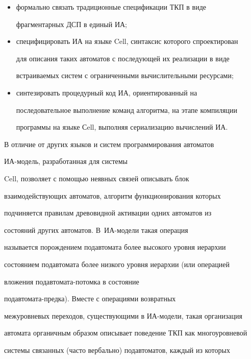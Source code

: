       \begin{itemize} %


      \item формально связать традиционные спецификации ТКП в виде 


фрагментарных ДСП в единый ИА;


\item специфицировать ИА на языке Cell, синтаксис которого спроектирован 


для описания таких автоматов с последующей их реализации в виде 


встраиваемых систем с ограниченными вычислительными ресурсами;


      \item синтезировать процедурный код ИА, ориентированный на 


последовательное выполнение команд алгоритма, на этапе компиляции 


программы на языке Сell, выполняя сериализацию вычислений ИА.


      \end{itemize}


      


      В отличие от других языков и систем программирования автоматов 


ИА-мо\-дель, разработанная для сис\-те\-мы 


Cell, позволяет с помощью неявных связей описывать блок 


взаимодействующих автоматов, алгоритм функционирования которых 


подчиняется правилам древовидной активации одних автоматов из 


      со\-сто\-яний других автоматов. В~ИА-мо\-де\-ли такая операция 


называется порождением подавтомата более высокого уровня иерархии 


состоянием подавтомата более низкого уровня иерархии (или операцией 


вложения под\-ав\-то\-ма\-та-по\-том\-ка в состояние 


      под\-ав\-то\-ма\-та-пред\-ка). Вместе с операциями возвратных 


межуровневых переходов, существующими в ИА-мо\-де\-ли, такая организация 


автомата органичным образом описывает поведение ТКП как многоуровневой 


системы связанных (час\-то вербально) подавтоматов, каждый из которых 


